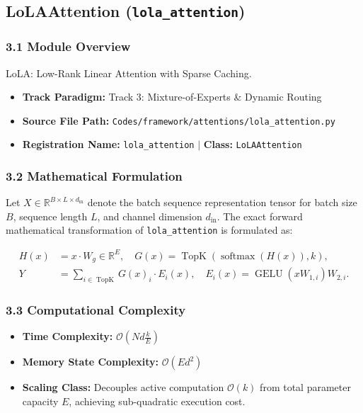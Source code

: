 \subsection{LoLAAttention (\texttt{lola\_attention})}
\label{sec:app_module_lola_attention}

\subsubsection*{3.1 Module Overview}
LoLA: Low-Rank Linear Attention with Sparse Caching.
\begin{itemize}
    \item \textbf{Track Paradigm:} Track 3: Mixture-of-Experts \& Dynamic Routing
    \item \textbf{Source File Path:} \texttt{Codes/framework/attentions/lola\_attention.py}
    \item \textbf{Registration Name:} \texttt{lola\_attention} $\mid$ \textbf{Class:} \texttt{LoLAAttention}
\end{itemize}

\subsubsection*{3.2 Mathematical Formulation}
Let $X \in \mathbb{R}^{B \times L \times d_{\text{in}}}$ denote the batch sequence representation tensor for batch size $B$, sequence length $L$, and channel dimension $d_{\text{in}}$. The exact forward mathematical transformation of \texttt{lola\_attention} is formulated as:

\begin{align}
H(x) &= x \cdot W_g \in \mathbb{R}^{E}, \quad G(x) = \operatorname{TopK}\left(\operatorname{softmax}(H(x)), k\right), \\
Y &= \sum_{i \in \operatorname{TopK}} G(x)_i \cdot E_i(x), \quad E_i(x) = \operatorname{GELU}(x W_{1, i}) W_{2, i}.
\end{align}


\subsubsection*{3.3 Computational Complexity}
\begin{itemize}
    \item \textbf{Time Complexity:} $\mathcal{O}(N d \frac{k}{E})$
    \item \textbf{Memory State Complexity:} $\mathcal{O}(E d^2)$
    \item \textbf{Scaling Class:} Decouples active computation $\mathcal{O}(k)$ from total parameter capacity $E$, achieving sub-quadratic execution cost.
\end{itemize}

